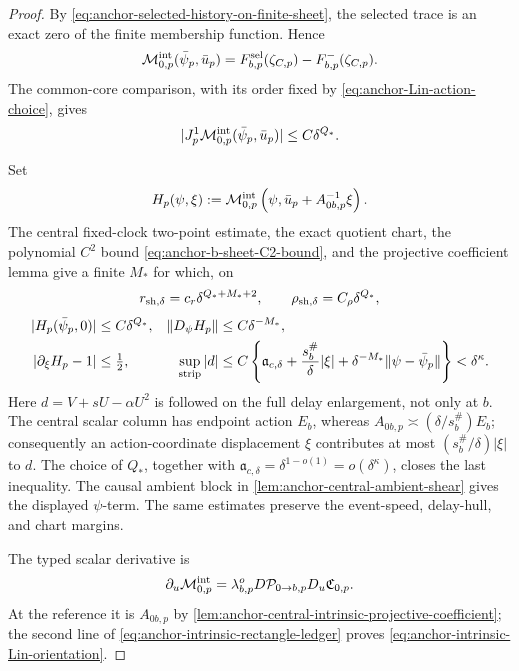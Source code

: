 \begin{proof}
By \cref{eq:anchor-selected-history-on-finite-sheet}, the selected trace is
an exact zero of the finite membership function.  Hence
\[
 \mathcal M_{0,p}^{\rm int}(\bar\psi_p,\bar u_p)
 =F_{b,p}^{\rm sel}(\zeta_{C,p})-F_{b,p}^-(\zeta_{C,p}).
\]
The common-core comparison, with its order fixed by
\cref{eq:anchor-Lin-action-choice}, gives
\begin{equation}
 |J_p^1\mathcal M_{0,p}^{\rm int}(\bar\psi_p,\bar u_p)|
 \le C\delta^{Q_*}.                                  \label{eq:anchor-intrinsic-reference-gap}
\end{equation}

Set
\[
 H_p(\psi,\xi)
 :=\mathcal M_{0,p}^{\rm int}
   \left(\psi,\bar u_p+A_{0b,p}^{-1}\xi\right).
\]
The central fixed-clock two-point estimate, the exact quotient chart, the
polynomial \(C^2\) bound \cref{eq:anchor-b-sheet-C2-bound}, and the
projective coefficient lemma give a finite \(M_*\) for which, on
\[
 r_{{\rm sh},\delta}=c_r\delta^{Q_*+M_*+2},
 \qquad
 \rho_{{\rm sh},\delta}=C_\rho\delta^{Q_*},
\]
\begin{align}
 |H_p(\bar\psi_p,0)|&\le C\delta^{Q_*},&
 \|D_\psi H_p\|&\le C\delta^{-M_*},\notag\\
 |\partial_\xi H_p-1|&\le\tfrac12,&
 \sup_{\rm strip}|d|
 &\le C\left\{\mathfrak a_{c,\delta}
       +\frac{s_b^\#}{\delta}|\xi|
       +\delta^{-M_*}\|\psi-\bar\psi_p\|\right\}
 <\delta^\kappa.                                     \label{eq:anchor-intrinsic-rectangle-ledger}
\end{align}
Here \(d=V+sU-\alpha U^2\) is followed on the full delay enlargement, not
only at \(b\).  The central scalar column has endpoint action \(E_b\),
whereas \(A_{0b,p}\asymp(\delta/s_b^\#)E_b\); consequently an
action-coordinate displacement \(\xi\) contributes at most
\((s_b^\#/\delta)|\xi|\) to \(d\).  The choice of \(Q_*\), together with
\(\mathfrak a_{c,\delta}=\delta^{1-o(1)}=o(\delta^\kappa)\), closes the
last inequality.  The causal ambient block in
\cref{lem:anchor-central-ambient-shear} gives the displayed \(\psi\)-term.
The same estimates preserve the event-speed, delay-hull, and chart margins.

The typed scalar derivative is
\[
 \partial_u\mathcal M_{0,p}^{\rm int}
 =\lambda_{b,p}^oD\mathcal P_{0\to b,p}
       D_u\mathfrak C_{0,p}.
\]
At the reference it is \(A_{0b,p}\) by
\cref{lem:anchor-central-intrinsic-projective-coefficient}; the second
line of \cref{eq:anchor-intrinsic-rectangle-ledger} proves
\cref{eq:anchor-intrinsic-Lin-orientation}.


\end{proof}
